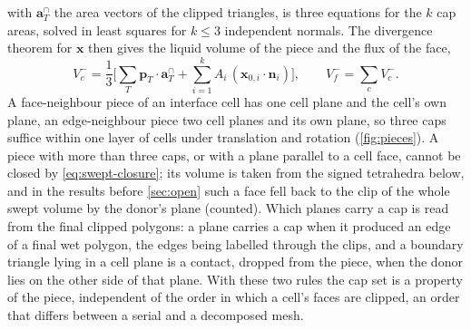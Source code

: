 \documentclass[preprint,12pt]{elsarticle}
\newcommand{\x}{\mathbf{x}}
\newcommand{\n}{\mathbf{n}}
\begin{document}
with $\mathbf{a}_T^{\cap}$ the area vectors of the clipped triangles, is three equations for the $k$ cap areas, solved in least squares for $k \le 3$ independent normals. The divergence theorem for $\x$ then gives the liquid volume of the piece and the flux of the face,
\begin{equation}
V_c^- = \frac13\Big[\sum_T \mathbf{p}_T\cdot\mathbf{a}_T^{\cap} + \sum_{i=1}^{k} A_i\,(\x_{0,i}\cdot\n_i)\Big], \qquad
V_f^- = \sum_c V_c^- .
\label{eq:swept-piece}
\end{equation}
A face-neighbour piece of an interface cell has one cell plane and the cell's own plane, an edge-neighbour piece two cell planes and its own plane, so three caps suffice within one layer of cells under translation and rotation (\cref{fig:pieces}). A piece with more than three caps, or with a plane parallel to a cell face, cannot be closed by \cref{eq:swept-closure}; its volume is taken from the signed tetrahedra below, and in the results before \cref{sec:open} such a face fell back to the clip of the whole swept volume by the donor's plane (counted). Which planes carry a cap is read from the final clipped polygons: a plane carries a cap when it produced an edge of a final wet polygon, the edges being labelled through the clips, and a boundary triangle lying in a cell plane is a contact, dropped from the piece, when the donor lies on the other side of that plane. With these two rules the cap set is a property of the piece, independent of the order in which a cell's faces are clipped, an order that differs between a serial and a decomposed mesh.


\end{document}
